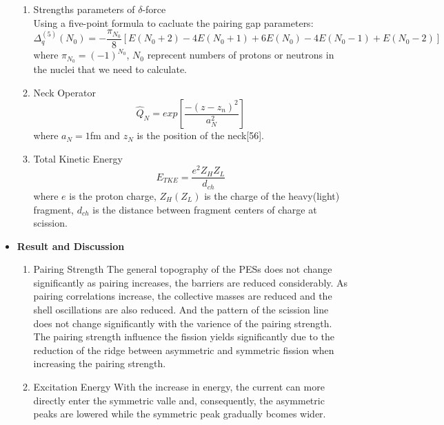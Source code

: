 \begin{itemize}[leftmargin=10pt]
\begin{enumerate}[leftmargin=10pt]
            \item Strengths parameters of $\delta$-force    \\
                Using a five-point formula to cacluate the pairing gap parameters:
                \begin{equation}
                    \Delta_{q}^{(5)} (N_0) = -\frac{\pi_{N_0}}{8} \left[ E(N_0 + 2) - 4E(N_0 + 1) + 6E(N_0) - 4E(N_0 - 1) + E(N_0 -2) \right]
                \end{equation}
                where $\pi_{N_0} = (-1)^{N_0}$, $N_0$ reprecent numbers of protons or neutrons in the nuclei that we need to calculate.
            \item Neck Operator     \\
                \begin{equation}
                    \hat{Q}_N = exp\left[ \frac{-(z-z_n)^2}{a_N^2} \right]
                \end{equation}
                where $a_N = 1$fm and $z_N$ is the position of the neck[56].
            \item Total Kinetic Energy  \\
                \begin{equation}
                    E_{TKE} = \frac{e^2 Z_H Z_L}{d_{ch}}
                \end{equation}
                where $e$ is the proton charge, $Z_H(Z_L)$ is the charge of the heavy(light) fragment, $d_{ch}$ is the distance between fragment centers of charge at scission.
        \end{enumerate}

    \item \textbf{Result and Discussion}
        \begin{enumerate}[leftmargin=10pt]
            \item Pairing Strength    \newline
                The general topography of the PESs does not change significantly as pairing increases, the barriers are reduced considerably.   \newline
                As pairing correlations increase, the collective masses are reduced and the shell oscillations are also reduced. And the pattern of the scission line does not change significantly with the varience of the pairing strength.  \newline
                The pairing strength influence the fission yields significantly due to the reduction of the ridge between asymmetric and symmetric fission when increasing the pairing strength.
            \item Excitation Energy \newline
                With the increase in energy, the current can more directly enter the symmetric valle and, consequently, the asymmetric peaks are lowered while the symmetric peak gradually bcomes wider.
        \end{enumerate}
\end{itemize}

